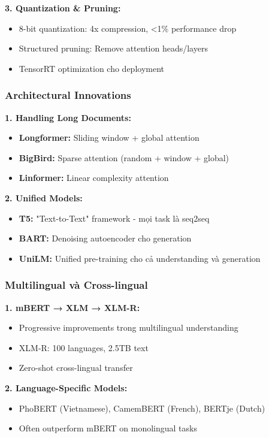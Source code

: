\textbf{3. Quantization & Pruning:}
\begin{itemize}
    \item 8-bit quantization: 4x compression, <1\% performance drop
    \item Structured pruning: Remove attention heads/layers
    \item TensorRT optimization cho deployment
\end{itemize}

\subsubsection{Architectural Innovations}

\textbf{1. Handling Long Documents:}
\begin{itemize}
    \item \textbf{Longformer:} Sliding window + global attention
    \item \textbf{BigBird:} Sparse attention (random + window + global)
    \item \textbf{Linformer:} Linear complexity attention
\end{itemize}

\textbf{2. Unified Models:}
\begin{itemize}
    \item \textbf{T5:} "Text-to-Text" framework - mọi task là seq2seq
    \item \textbf{BART:} Denoising autoencoder cho generation
    \item \textbf{UniLM:} Unified pre-training cho cả understanding và generation
\end{itemize}

\subsubsection{Multilingual và Cross-lingual}

\textbf{1. mBERT → XLM → XLM-R:}
\begin{itemize}
    \item Progressive improvements trong multilingual understanding
    \item XLM-R: 100 languages, 2.5TB text
    \item Zero-shot cross-lingual transfer
\end{itemize}

\textbf{2. Language-Specific Models:}
\begin{itemize}
    \item PhoBERT (Vietnamese), CamemBERT (French), BERTje (Dutch)
    \item Often outperform mBERT on monolingual tasks
\end{itemize}

